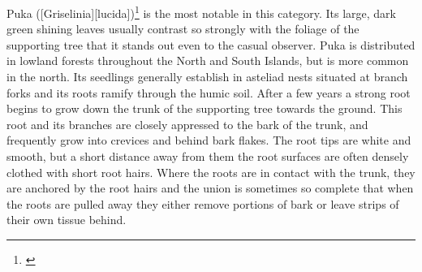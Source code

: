 Puka ([Griselinia][lucida])\footnote{\cite{dawson1966vegetative}} is the most notable in this category.
Its large, dark green shining leaves usually contrast so strongly with the foliage of the supporting tree that it stands out even to the casual observer.
Puka is distributed in lowland forests throughout the North and South Islands, but is more common in the north.
Its seedlings generally establish in asteliad nests situated at branch forks and its roots ramify through the humic soil.
After a few years a strong root begins to grow down the trunk of the supporting tree towards the ground.
This root and its branches are closely appressed to the bark of the trunk, and frequently grow into crevices and behind bark flakes.
The root tips are white and smooth, but a short distance away from them the root surfaces are often densely clothed with short root hairs.
Where the roots are in contact with the trunk, they are anchored by the root hairs and the union is sometimes so complete that when the roots are pulled away they either remove portions of bark or leave strips of their own tissue behind.

